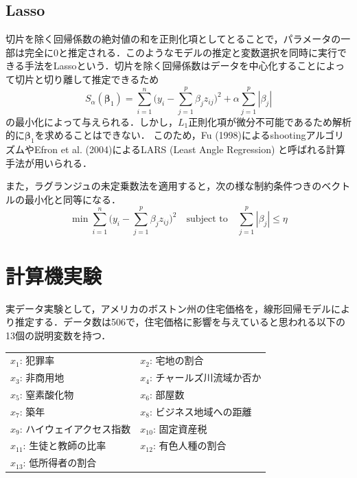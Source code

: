 \documentclass[a4paper,twocolumn]{ujarticle} %
\begin{document}
\subsection{Lasso}
切片を除く回帰係数の絶対値の和を正則化項としてとることで，パラメータの一部は完全に0と推定される．このようなモデルの推定と変数選択を同時に実行できる手法をLassoという．切片を除く回帰係数はデータを中心化することによって切片と切り離して推定できるため
\begin{equation}
        S_{\alpha}(\bm\beta_1) = \sum_{i=1}^{n} \bigl(
        	y_i - \sum_{j=1}^{p} \beta_j z_{ij}
        \bigr)^2 + \alpha \sum_{j=1}^{p}|\beta_j|
\end{equation}
の最小化によって与えられる．しかし，$L_1$正則化項が微分不可能であるため解析的に$\bm{\beta}_1$を求めることはできない．
このため，Fu (1998)によるshootingアルゴリズムやEfron et al. (2004)によるLARS (Least Angle Regression) と呼ばれる計算手法が用いられる．

また，ラグランジュの未定乗数法を適用すると，次の様な制約条件つきのベクトルの最小化と同等になる．
\begin{equation}
	\min \sum_{i=1}^{n}\bigl(
		 y_i - \sum_{j=1}^{p} \beta_j z_{ij}
	\bigr)^2 \quad
	\text{subject to} \quad \sum_{j=1}^{p} |\beta_j| \leq \eta
\end{equation}

\section{計算機実験}
実データ実験として，アメリカのボストン州の住宅価格を，線形回帰モデルにより推定する．データ数は506で，住宅価格に影響を与えていると思われる以下の13個の説明変数を持つ．
\begin{table}[htb]
	\begin{tabular}{ll}
	$x_1$: 犯罪率  & $x_2$: 宅地の割合\\
	$x_3$: 非商用地 &  $x_4$: チャールズ川流域か否か\\
	$x_5$: 窒素酸化物 &  $x_6$: 部屋数\\
	$x_7$: 築年 &  $x_8$: ビジネス地域への距離\\
	$x_9$: ハイウェイアクセス指数 &  $x_{10}$: 固定資産税\\
	$x_{11}$: 生徒と教師の比率 &  $x_{12}$: 有色人種の割合\\
	$x_{13}$: 低所得者の割合\\
	\end{tabular}
\end{table}
\end{document}
